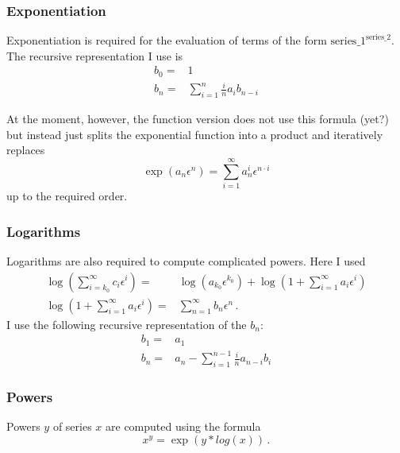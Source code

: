 \documentclass{article}
\begin{document}
\subsubsection{Exponentiation}
\label{sec:impl_exp}

Exponentiation is required for the evaluation of terms of the form
$\text{series\_1}^{\text{series\_2}}$.
The recursive representation I use is
\begin{align}
  \label{eq:exp_rec}
b_0=&1\\
b_n =&  \sum_{i=1}^{n} \frac{i}{n} a_{i}b_{n-i}
\end{align}

 At the moment, however, the function version does not use this formula (yet?) but instead just splits the
 exponential function into a product and iteratively replaces
 \begin{equation}
   \label{eq:exp_simple}
   \exp(a_n \epsilon^n)=\sum_{i=1}^\infty a_n^i \epsilon^{n\cdot i}
 \end{equation}
up to the required order.


\subsubsection{Logarithms}
\label{sec:impl_log}

Logarithms are also required to compute complicated powers. Here I used
\begin{align}
  \label{eq:log}
\log\left(\sum_{i=k_0}^{\infty}c_i \epsilon^i\right)=&\log\left(a_{k_0}\epsilon^{k_0}\right)+\log\left(1+\sum_{i=1}^{\infty}a_i \epsilon^i\right)\\
\log\left(1+\sum_{i=1}^{\infty}a_i \epsilon^i\right)=&\sum_{n=1}^\infty
b_n\epsilon^n\,.
\end{align}
I use the following recursive representation of the $b_n$:
\begin{align}
  \label{eq:log_rec}
b_1=&a_1\\
b_n =& a_n - \sum_{i=1}^{n-1} \frac{i}{n} a_{n-i}b_{i}
\end{align}

\subsubsection{Powers}
\label{sec:impl_pow}

Powers $y$ of series $x$ are computed using the formula
\begin{equation}
  \label{eq:pow}
  x^y=\exp(y*log(x))\,.
\end{equation}
\end{document}
